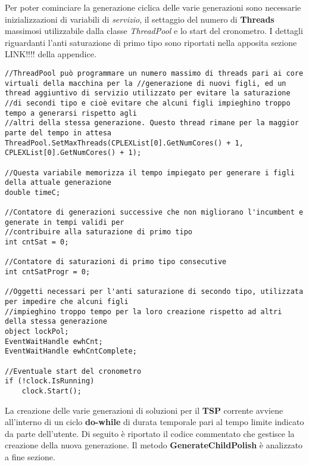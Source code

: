 \documentclass[11pt]{article}
\begin{document}
Per poter cominciare la generazione ciclica delle varie generazioni sono necessarie inizializzazioni di variabili di \textit{servizio}, il settaggio del numero di \textbf{Threads} massimosi utilizzabile dalla classe \textit{ThreadPool} e lo start del cronometro. I dettagli riguardanti l'anti saturazione di primo tipo sono riportati nella apposita sezione LINK!!!! della appendice.

\begin{lstlisting}
//ThreadPool può programmare un numero massimo di threads pari ai core virtuali della macchina per la //generazione di nuovi figli, ed un thread aggiuntivo di servizio utilizzato per evitare la saturazione
//di secondi tipo e cioè evitare che alcuni figli impieghino troppo tempo a generarsi rispetto agli
//altri della stessa generazione. Questo thread rimane per la maggior parte del tempo in attesa
ThreadPool.SetMaxThreads(CPLEXList[0].GetNumCores() + 1, CPLEXList[0].GetNumCores() + 1);

//Questa variabile memorizza il tempo impiegato per generare i figli della attuale generazione
double timeC;

//Contatore di generazioni successive che non migliorano l'incumbent e generate in tempi validi per
//contribuire alla saturazione di primo tipo
int cntSat = 0;

//Contatore di saturazioni di primo tipo consecutive
int cntSatProgr = 0;

//Oggetti necessari per l'anti saturazione di secondo tipo, utilizzata per impedire che alcuni figli
//impieghino troppo tempo per la loro creazione rispetto ad altri della stessa generazione
object lockPol;
EventWaitHandle ewhCnt;
EventWaitHandle ewhCntComplete;

//Eventuale start del cronometro
if (!clock.IsRunning)
    clock.Start();
\end{lstlisting}

La creazione delle varie generazioni di soluzioni per il \textbf{TSP} corrente avviene all'interno di un ciclo \textbf{do-while} di durata temporale pari al tempo limite indicato da parte dell'utente. Di seguito è riportato il codice commentato che gestisce la creazione della nuova generazione. Il metodo \textbf{GenerateChildPolish} è analizzato a fine sezione.
\end{document}
